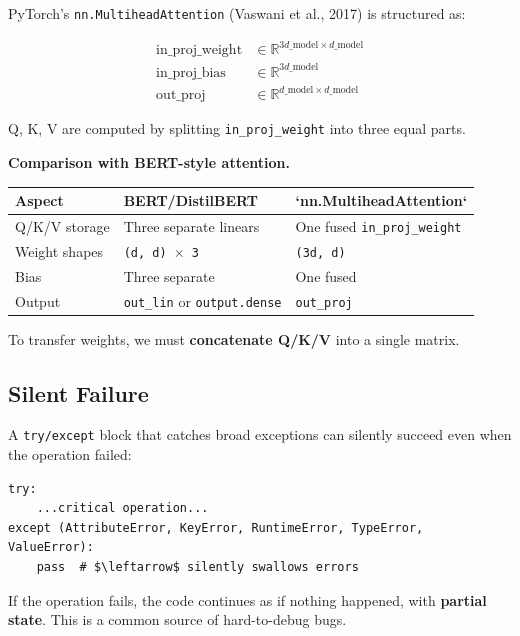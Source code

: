PyTorch's \texttt{nn.MultiheadAttention} (Vaswani et al., 2017) is structured as:

\[
\begin{aligned}
\text{in\_proj\_weight} &\in \mathbb{R}^{3 d\_\text{model} \times d\_\text{model}} \\
\text{in\_proj\_bias} &\in \mathbb{R}^{3 d\_\text{model}} \\
\text{out\_proj} &\in \mathbb{R}^{d\_\text{model} \times d\_\text{model}}
\end{aligned}
\tag{3.3}
\]

Q, K, V are computed by splitting \texttt{in\_proj\_weight} into three equal parts.

\textbf{Comparison with BERT-style attention.}

\begin{table}[H]
\centering
\small
\begin{tabular}{lll}
\toprule
\textbf{Aspect} & \textbf{BERT/DistilBERT} & \textbf{`nn.MultiheadAttention`} \\
\midrule
Q/K/V storage & Three separate linears & One fused \texttt{in\_proj\_weight} \\
Weight shapes & \texttt{(d, d) $\times$ 3} & \texttt{(3d, d)} \\
Bias & Three separate & One fused \\
Output & \texttt{out\_lin} or \texttt{output.dense} & \texttt{out\_proj} \\
\bottomrule
\end{tabular}
\end{table}

To transfer weights, we must \textbf{concatenate Q/K/V} into a single matrix.

\subsection{Silent Failure}

A \texttt{try/except} block that catches broad exceptions can silently succeed 
even when the operation failed:

\begin{lstlisting}
try:
    ...critical operation...
except (AttributeError, KeyError, RuntimeError, TypeError, ValueError):
    pass  # $\leftarrow$ silently swallows errors
\end{lstlisting}

If the operation fails, the code continues as if nothing happened, with 
\textbf{partial state}. This is a common source of hard-to-debug bugs.


